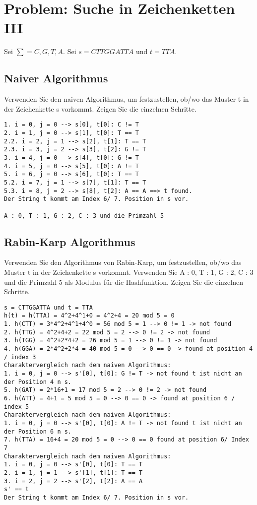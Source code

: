 \section{Problem: Suche in Zeichenketten III}

 Sei $\sum = C, G, T, A.$ Sei $s = CTTGGATTA$ und $t = TTA$.



\subsection{Naiver Algorithmus}
Verwenden Sie den naiven Algorithmus, um festzustellen, ob/wo das Muster t
in der Zeichenkette s vorkommt.
Zeigen Sie die einzelnen Schritte.

\vspace{1em}

\begin{verbatim}
1. i = 0, j = 0 --> s[0], t[0]: C != T
2. i = 1, j = 0 --> s[1], t[0]: T == T
2.2. i = 2, j = 1 --> s[2], t[1]: T == T
2.3. i = 3, j = 2 --> s[3], t[2]: G != T
3. i = 4, j = 0 --> s[4], t[0]: G != T
4. i = 5, j = 0 --> s[5], t[0]: A != T
5. i = 6, j = 0 --> s[6], t[0]: T == T
5.2. i = 7, j = 1 --> s[7], t[1]: T == T
5.3. i = 8, j = 2 --> s[8], t[2]: A == A ==> t found.
Der String t kommt am Index 6/ 7. Position in s vor.

A : 0, T : 1, G : 2, C : 3 und die Primzahl 5
\end{verbatim}

\subsection{Rabin-Karp Algorithmus}
Verwenden Sie den Algorithmus von Rabin-Karp, um festzustellen, ob/wo das
Muster t in der Zeichenkette s vorkommt. Verwenden Sie A : 0, T : 1, G : 2, C :
3 und die Primzahl 5 als Modulus für die Hashfunktion.
Zeigen Sie die einzelnen Schritte.

\vspace{1em}

\begin{verbatim}
s = CTTGGATTA und t = TTA
h(t) = h(TTA) = 4^2+4^1+0 = 4^2+4 = 20 mod 5 = 0
1. h(CTT) = 3*4^2+4^1+4^0 = 56 mod 5 = 1 --> 0 != 1 -> not found
2. h(TTG) = 4^2+4+2 = 22 mod 5 = 2 --> 0 != 2 -> not found
3. h(TGG) = 4^2+2*4+2 = 26 mod 5 = 1 --> 0 != 1 -> not found
4. h(GGA) = 2*4^2+2*4 = 40 mod 5 = 0 --> 0 == 0 -> found at position 4 / index 3
Charaktervergleich nach dem naiven Algorithmus:
1. i = 0, j = 0 --> s'[0], t[0]: G != T -> not found t ist nicht an der Position 4 n s.
5. h(GAT) = 2*16+1 = 17 mod 5 = 2 --> 0 != 2 -> not found
6. h(ATT) = 4+1 = 5 mod 5 = 0 --> 0 == 0 -> found at position 6 / index 5
Charaktervergleich nach dem naiven Algorithmus:
1. i = 0, j = 0 --> s'[0], t[0]: A != T -> not found t ist nicht an der Position 6 n s.
7. h(TTA) = 16+4 = 20 mod 5 = 0 --> 0 == 0 found at position 6/ Index 7
Charaktervergleich nach dem naiven Algorithmus:
1. i = 0, j = 0 --> s'[0], t[0]: T == T
2. i = 1, j = 1 --> s'[1], t[1]: T == T
3. i = 2, j = 2 --> s'[2], t[2]: A == A
s' == t
Der String t kommt am Index 6/ 7. Position in s vor.
\end{verbatim}

